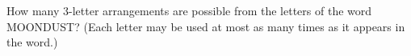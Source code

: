 How many $3$-letter arrangements are possible from the letters of the word MOONDUST? (Each letter may be used at most as many times as it appears in the word.)
